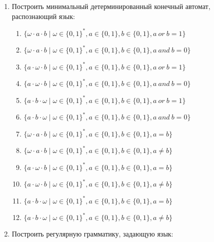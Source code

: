 \documentclass[12pt]{article}
\begin{document}
\begin{enumerate}
  \item Построить минимальный детерминированный конечный автомат, распознающий язык:
  \begin{enumerate}[label=\arabic*)]
    \setlength\itemsep{0.8em}
    \item $\{ \omega \cdot a \cdot b \mid \omega \in \{0, 1\}^*, a \in \{0, 1\}, b \in \{0, 1\}, a \ or \ b = 1 \}$
    \item $\{ \omega \cdot a \cdot b \mid \omega \in \{0, 1\}^*, a \in \{0, 1\}, b \in \{0, 1\}, a \ and \ b = 0 \}$
    \item $\{ a \cdot \omega \cdot b \mid \omega \in \{0, 1\}^*, a \in \{0, 1\}, b \in \{0, 1\}, a \ or \ b = 1 \}$
    \item $\{ a \cdot \omega \cdot b \mid \omega \in \{0, 1\}^*, a \in \{0, 1\}, b \in \{0, 1\}, a \ and \ b = 0 \}$
    \item $\{ a \cdot b \cdot \omega \mid \omega \in \{0, 1\}^*, a \in \{0, 1\}, b \in \{0, 1\}, a \ or \ b = 1 \}$
    \item $\{ a \cdot b \cdot \omega \mid \omega \in \{0, 1\}^*, a \in \{0, 1\}, b \in \{0, 1\}, a \ and \ b = 0 \}$


    \item $\{ \omega \cdot a \cdot b \mid \omega \in \{0, 1\}^*, a \in \{0, 1\}, b \in \{0, 1\}, a = b \}$
    \item $\{ \omega \cdot a \cdot b \mid \omega \in \{0, 1\}^*, a \in \{0, 1\}, b \in \{0, 1\}, a \neq b \}$
    \item $\{ a \cdot \omega \cdot b \mid \omega \in \{0, 1\}^*, a \in \{0, 1\}, b \in \{0, 1\}, a = b \}$
    \item $\{ a \cdot \omega \cdot b \mid \omega \in \{0, 1\}^*, a \in \{0, 1\}, b \in \{0, 1\}, a \neq b \}$
    \item $\{ a \cdot b \cdot \omega \mid \omega \in \{0, 1\}^*, a \in \{0, 1\}, b \in \{0, 1\}, a = b \}$
    \item $\{ a \cdot b \cdot \omega \mid \omega \in \{0, 1\}^*, a \in \{0, 1\}, b \in \{0, 1\}, a \neq b \}$

  \end{enumerate}

  \item Построить регулярную грамматику, задающую язык:
  \begin{enumerate}[label=\arabic*)]
    \setlength\itemsep{0.8em}


\end{enumerate}
\end{enumerate}
\end{document}
